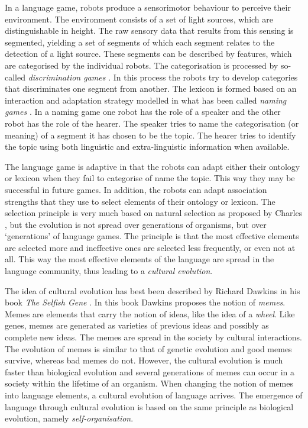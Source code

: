 In a language game, robots produce a sensorimotor behaviour to perceive their environment. The environment consists of a set of light sources, which are distinguishable in height. The raw sensory data that results from this sensing is segmented, yielding a set of segments of which each segment relates to the detection of a light source. These segments can be described by features, which are categorised by the individual robots. The categorisation is processed by so-called {\em discrimination games} \citep{steels:1996b}. In this process the robots try to develop categories that discriminates one segment from another. The lexicon is formed based on an interaction and adaptation strategy modelled in what has been called {\em naming games} \citep{steels:1996a}. In a naming game one robot has the role of a speaker and the other robot has the role of the hearer. The speaker tries to name the categorisation (or meaning) of a segment it has chosen to be the topic. The hearer tries to identify the topic using both linguistic and extra-linguistic information when available.


The language game is adaptive in that the robots can adapt either their ontology or lexicon when they fail to categorise of name the topic. This way they may be successful in future games. In addition, the robots can adapt association strengths that they use to select elements of their ontology or lexicon. The selection principle is very much based on natural selection as proposed by Charles \citet{darwin:1968}, but the evolution is not  spread over generations of organisms, but over `generations' of language games. The principle is that the most effective elements are selected more and ineffective ones are selected less frequently, or even not at all. This way the most effective elements of the language are spread in the language community, thus leading to a {\em cultural evolution}.

The idea of cultural evolution has best been described by Richard Dawkins in his book {\em The Selfish Gene} \citep{dawkins:1976}. In this book Dawkins proposes the notion of {\em memes}. Memes are elements that carry the notion of ideas, like the idea of a {\em wheel}. Like genes, memes are generated as varieties of previous ideas and possibly as complete new ideas. The memes are spread in the society by cultural interactions. The evolution of memes is similar to that of genetic evolution and good memes survive, whereas bad memes do not. However, the cultural evolution is much faster than biological evolution and several generations of memes can occur in a society within the lifetime of an organism. When changing the notion of memes into language elements, a cultural evolution of language arrives. The emergence of language through cultural evolution is based on the same principle as biological evolution, namely {\em self-organisation}.


